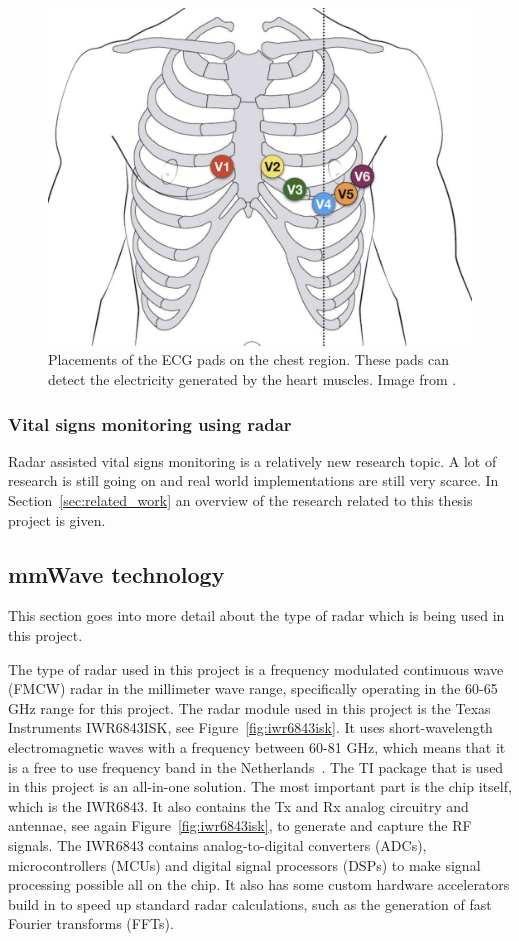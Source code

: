 \begin{figure}[t]
\centering
\includegraphics[width=.5\textwidth]{figures/background/ecg.png}
\caption{Placements of the ECG pads on the chest region. These pads can detect the electricity generated by the heart muscles. Image from \cite{ecg_lead_website}.}
\label{fig:ecg}
\end{figure}

\subsubsection{Vital signs monitoring using radar}
Radar assisted vital signs monitoring is a relatively new research topic. A lot of research is still going on and real world implementations are still very scarce. In Section~\ref{sec:related_work} an overview of the research related to this thesis project is given.  

\subsection{mmWave technology}
\label{sec:mmwave_tech}
This section goes into more detail about the type of radar which is being used in this project.

The type of radar used in this project is a frequency modulated continuous wave (FMCW) radar in the millimeter wave range, specifically operating in the 60-65 GHz range for this project. The radar module used in this project is the Texas Instruments IWR6843ISK, see Figure~\ref{fig:iwr6843isk}. It uses short-wavelength electromagnetic waves with a frequency between 60-81 GHz, which means that it is a free to use frequency band in the Netherlands~\cite{freq_plan}. The TI package that is used in this project is an all-in-one solution. The most important part is the chip itself, which is the IWR6843. It also contains the Tx and Rx analog circuitry and antennae, see again Figure~\ref{fig:iwr6843isk}, to generate and capture the RF signals. The IWR6843 contains analog-to-digital converters (ADCs), microcontrollers (MCUs) and digital signal processors (DSPs) to make signal processing possible all on the chip. It also has some custom hardware accelerators build in to speed up standard radar calculations, such as the generation of fast Fourier transforms (FFTs).

